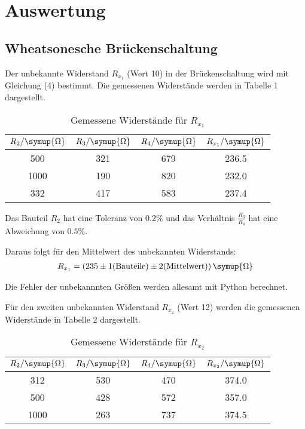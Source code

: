 \section{Auswertung}
\label{sec:Auswertung}

\subsection{Wheatsonesche Brückenschaltung}
Der unbekannte Widerstand $R_{x_1}$ (Wert 10) in der Brückenschaltung wird mit Gleichung (4) bestimmt. Die gemessenen Widerstände
werden in Tabelle 1 dargestellt.

\begin{table}[H]
  \centering
  \caption{Gemessene Widerstände für $R_{x_1}$}
  \label{tab:Widerstand}
  \begin{tabular}{c c c c}
    \toprule
    $R_2/ \symup{\Omega}$ & $R_3/ \symup{\Omega}$ & $R_4 / \symup{\Omega}$ & $R_{x_1}/ \symup{\Omega}$\\
    \midrule
     500  &  321 & 679  &  236.5 \\
    1000  &  190 & 820  &  232.0  \\
     332  &  417 & 583  &  237.4  \\
    \bottomrule
  \end{tabular}
\end{table}



Das Bauteil $R_2$ hat eine Toleranz von $0.2\%$ und das Verhältnis $\frac{R_3}{R_4}$ hat eine Abweichung von
$0.5\%$.

Daraus folgt für den Mittelwert  des unbekannten Widerstands:
\begin{align*}
  R_{x_1} = (235 \pm 1\text{(Bauteile)} \pm 2\text{(Mittelwert)}) \, \symup{\Omega}
\end{align*}

Die Fehler der unbekannnten Größen werden allesamt mit Python berechnet.

Für den zweiten unbekannten Widerstand $R_{x_2}$ (Wert 12) werden die gemessenen Widerstände in Tabelle 2 dargestellt.

\begin{table}[H]
  \centering
  \caption{Gemessene Widerstände für $R_{x_2}$}
  \label{tab:Widerstand}
  \begin{tabular}{c c c c}
    \toprule
    $R_2/ \symup{\Omega}$ & $R_3/ \symup{\Omega}$ & $R_4 / \symup{\Omega}$ & $R_{x_2}/ \symup{\Omega}$ \\
    \midrule
      312  &  530 & 470 & 374.0 \\
      500  &  428 & 572 & 357.0  \\
     1000  &  263 & 737 & 374.5  \\
    \bottomrule
  \end{tabular}
\end{table}

